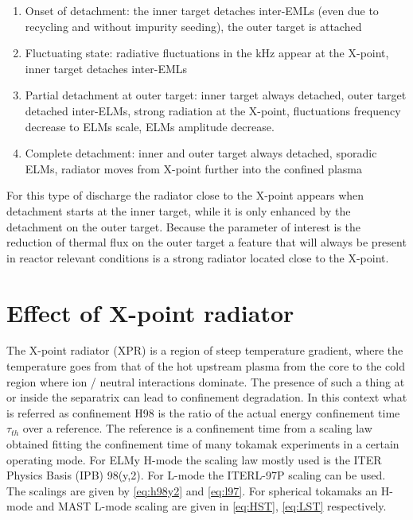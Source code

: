 \begin{enumerate}
    \item Onset of detachment: the inner target detaches inter-EMLs (even due to recycling and without impurity seeding), the outer target is attached
    \item Fluctuating state: radiative fluctuations in the kHz appear at the X-point, inner target detaches inter-EMLs
    \item Partial detachment at outer target: inner target always detached, outer target detached inter-ELMs, strong radiation at the X-point, fluctuations frequency decrease to ELMs scale, ELMs amplitude decrease.
    \item Complete detachment: inner and outer target always detached, sporadic ELMs, radiator moves from X-point further into the confined plasma
\end{enumerate}

For this type of discharge the radiator close to the X-point appears when detachment starts at the inner target, while it is only enhanced by the detachment on the outer target. Because the parameter of interest is the reduction of thermal flux on the outer target a feature that will always be present in reactor relevant conditions is a strong radiator located close to the X-point.

\section{Effect of X-point radiator}\label{Effect of X-point radiator}


The X-point radiator (XPR) is a region of steep temperature gradient, where the temperature goes from that of the hot upstream plasma from the core to the cold region where ion / neutral interactions dominate. The presence of such a thing at or inside the separatrix can lead to confinement degradation. In this context what is referred as confinement H98 is the ratio of the actual energy confinement time $\tau_{th}$ over a reference. The reference is a confinement time from a scaling law obtained fitting the confinement time of many tokamak experiments in a certain operating mode. For ELMy H-mode the scaling law mostly used is the ITER Physics Basis (IPB) 98(y,2).\cite{Doyle2007} For L-mode the ITERL-97P scaling can be used. \cite{Kaye1997} The scalings are given by \autoref{eq:h98y2} and \ref{eq:l97}. For spherical tokamaks an H-mode \cite{Kaye2006} and MAST L-mode \cite{Kaye2021} scaling are given in \autoref{eq:HST}, \ref{eq:LST} respectively.


